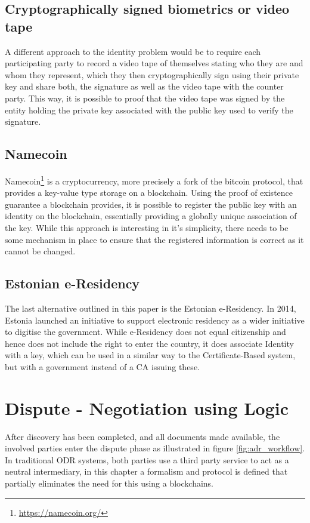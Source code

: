 \documentclass[12pt,msc,a4paper,oneside]{ucl_thesis}
\begin{document}
\section{Cryptographically signed biometrics or video tape}
A different approach to the identity problem would be to require each participating party to record a video tape of themselves stating who they are and whom they represent, which they then cryptographically sign using their private key and share both, the signature as well as the video tape with the counter party. This way, it is possible to proof that the video tape was signed by the entity holding the private key associated with the public key used to verify the signature.

\section{Namecoin}
Namecoin\footnote{\url{https://namecoin.org/}} is a cryptocurrency, more precisely a fork of the bitcoin protocol, that provides a key-value type storage on a blockchain. Using the proof of existence guarantee a blockchain provides, it is possible to register the public key with an identity on the blockchain, essentially providing a globally unique association of the key. While this approach is interesting in it's simplicity, there needs to be some mechanism in place to ensure that the registered information is correct as it cannot be changed.

\section{Estonian e-Residency}
The last alternative outlined in this paper is the Estonian e-Residency. In 2014, Estonia launched an initiative to support electronic residency as a wider initiative to digitise the government. While e-Residency does not equal citizenship and hence does not include the right to enter the country, it does associate Identity with a key, which can be used in a similar way to the Certificate-Based system, but with a government instead of a CA issuing these. \cite{estonia:eResidency}

\chapter{Dispute - Negotiation using Logic} \label{chapter:dispute}
After discovery has been completed, and all documents made available, the involved parties enter the dispute phase as illustrated in figure \ref{fig:adr_workflow}. In traditional ODR systems, both parties use a third party service to act as a neutral intermediary, in this chapter a formalism and protocol is defined that partially eliminates the need for this using a blockchains.
\end{document}
